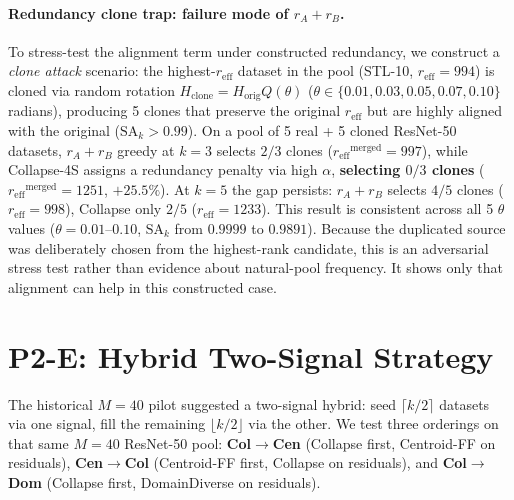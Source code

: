 \documentclass{article}
\newcommand{\reff}{\ensuremath{r_{\mathrm{eff}}}\xspace}
\newcommand{\SAk}{\ensuremath{\mathrm{SA}_k}\xspace}
\begin{document}
\paragraph{Redundancy clone trap: failure mode of $r_A{+}r_B$.}
To stress-test the alignment term under constructed redundancy,
we construct a \emph{clone attack} scenario: the highest-$\reff$ dataset
in the pool (STL-10, $\reff{=}994$) is cloned via random rotation
$H_{\mathrm{clone}}{=}H_{\mathrm{orig}}Q(\theta)$
($\theta\in\{0.01,0.03,0.05,0.07,0.10\}$ radians), producing 5 clones
that preserve the original $\reff$ but are highly aligned with the
original ($\SAk{>}0.99$).
On a pool of 5 real + 5 cloned ResNet-50 datasets, $r_A{+}r_B$ greedy
at $k{=}3$ selects $2/3$ clones ($\reff^{\mathrm{merged}}{=}997$),
while Collapse-4S assigns a redundancy penalty via high $\alpha$,
\textbf{selecting $0/3$ clones}
($\reff^{\mathrm{merged}}{=}1251$, $+25.5\%$).
At $k{=}5$ the gap persists: $r_A{+}r_B$ selects $4/5$ clones
($\reff{=}998$), Collapse only $2/5$ ($\reff{=}1233$).
This result is consistent across all 5 $\theta$ values
($\theta{=}0.01$--$0.10$, $\SAk$ from $0.9999$ to $0.9891$).
Because the duplicated source was deliberately chosen from the highest-rank
candidate, this is an adversarial stress test rather than evidence about
natural-pool frequency.  It shows only that alignment can help in this
constructed case.

\section{P2-E: Hybrid Two-Signal Strategy}
\label{app:p2e_hybrid}

The historical $M{=}40$ pilot suggested a two-signal hybrid:
seed $\lceil k/2\rceil$ datasets via one signal, fill the remaining
$\lfloor k/2\rfloor$ via the other.
We test three orderings on that same $M{=}40$ ResNet-50 pool:
\textbf{Col$\to$Cen} (Collapse first, Centroid-FF on residuals),
\textbf{Cen$\to$Col} (Centroid-FF first, Collapse on residuals), and
\textbf{Col$\to$Dom} (Collapse first, DomainDiverse on residuals).
\end{document}
